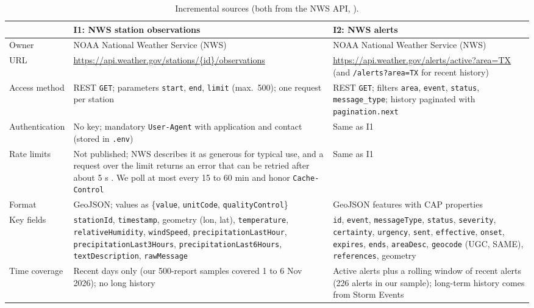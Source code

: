 \documentclass[11pt,letterpaper]{article}
\begin{document}
\begin{table}[H]\centering\footnotesize\renewcommand{\arraystretch}{1.2}
\caption{Incremental sources (both from the NWS API, \citealp{nws_api}).}\label{tab:inc}
\begin{tabular}{@{}>{\raggedright\arraybackslash}p{2.6cm}>{\raggedright\arraybackslash}p{6.2cm}>{\raggedright\arraybackslash}p{6.2cm}@{}}\toprule
 & \textbf{I1: NWS station observations} & \textbf{I2: NWS alerts}\\\midrule
Owner & NOAA National Weather Service (NWS) & NOAA National Weather Service (NWS) \\
URL & \url{https://api.weather.gov/stations/{id}/observations} & \url{https://api.weather.gov/alerts/active?area=TX} (and \texttt{/alerts?area=TX} for recent history) \\
Access method & REST \texttt{GET}; parameters \texttt{start}, \texttt{end}, \texttt{limit} (max.\ 500); one request per station & REST \texttt{GET}; filters \texttt{area}, \texttt{event}, \texttt{status}, \texttt{message\_type}; history paginated with \texttt{pagination.next} \\
Authentication & No key; mandatory \texttt{User-Agent} with application and contact (stored in \texttt{.env}) & Same as I1 \\
Rate limits & Not published; NWS describes it as generous for typical use, and a request over the limit returns an error that can be retried after about 5 s \citep{nws_api}. We poll at most every 15 to 60 min and honor \texttt{Cache-Control} & Same as I1 \\
Format & GeoJSON; values as \{\texttt{value}, \texttt{unitCode}, \texttt{qualityControl}\} & GeoJSON features with CAP properties \\
Key fields & \texttt{stationId}, \texttt{timestamp}, geometry (lon, lat), \texttt{temperature}, \texttt{relativeHumidity}, \texttt{windSpeed}, \texttt{precipitationLastHour}, \texttt{precipitationLast3Hours}, \texttt{precipitationLast6Hours}, \texttt{textDescription}, \texttt{rawMessage} & \texttt{id}, \texttt{event}, \texttt{messageType}, \texttt{status}, \texttt{severity}, \texttt{certainty}, \texttt{urgency}, \texttt{sent}, \texttt{effective}, \texttt{onset}, \texttt{expires}, \texttt{ends}, \texttt{areaDesc}, \texttt{geocode} (UGC, SAME), \texttt{references}, geometry \\
Time coverage & Recent days only (our 500-report samples covered 1 to 6 Nov 2026); no long history & Active alerts plus a rolling window of recent alerts (226 alerts in our sample); long-term history comes from Storm Events \\

\end{tabular}
\end{table}
\end{document}
